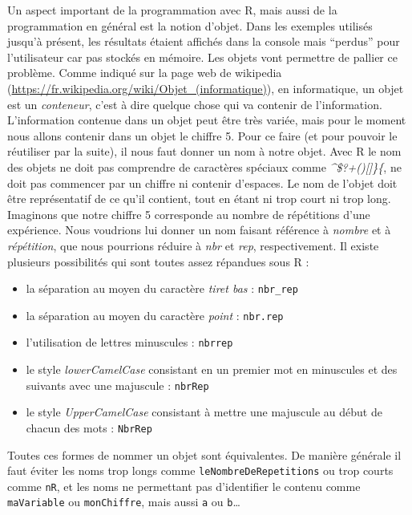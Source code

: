 \documentclass[twoside,symmetric]{book}
\providecommand{\tightlist}{%
  \setlength{\itemsep}{0pt}\setlength{\parskip}{0pt}}
\begin{document}
Un aspect important de la programmation avec R, mais aussi de la programmation en général est la notion d'objet. Dans les exemples utilisés jusqu'à présent, les résultats étaient affichés dans la console mais ``perdus'' pour l'utilisateur car pas stockés en mémoire. Les objets vont permettre de pallier ce problème. Comme indiqué sur la page web de wikipedia (\url{https://fr.wikipedia.org/wiki/Objet_(informatique)}), en informatique, un objet est un \emph{conteneur}, c'est à dire quelque chose qui va contenir de l'information. L'information contenue dans un objet peut être très variée, mais pour le moment nous allons contenir dans un objet le chiffre 5. Pour ce faire (et pour pouvoir le réutiliser par la suite), il nous faut donner un nom à notre objet. Avec R le nom des objets ne doit pas comprendre de caractères spéciaux comme \emph{\^{}\$?\textbar{}+(){[}{]}\}\{}, ne doit pas commencer par un chiffre ni contenir d'espaces. Le nom de l'objet doit être représentatif de ce qu'il contient, tout en étant ni trop court ni trop long. Imaginons que notre chiffre 5 corresponde au nombre de répétitions d'une expérience. Nous voudrions lui donner un nom faisant référence à \emph{nombre} et à \emph{répétition}, que nous pourrions réduire à \emph{nbr} et \emph{rep}, respectivement. Il existe plusieurs possibilités qui sont toutes assez répandues sous R :

\begin{itemize}
\tightlist
\item
  la séparation au moyen du caractère \emph{tiret bas} : \texttt{nbr\_rep}
\item
  la séparation au moyen du caractère \emph{point} : \texttt{nbr.rep}
\item
  l'utilisation de lettres minuscules : \texttt{nbrrep}
\item
  le style \emph{lowerCamelCase} consistant en un premier mot en minuscules et des suivants avec une majuscule : \texttt{nbrRep}
\item
  le style \emph{UpperCamelCase} consistant à mettre une majuscule au début de chacun des mots : \texttt{NbrRep}
\end{itemize}

Toutes ces formes de nommer un objet sont équivalentes. De manière générale il faut éviter les noms trop longs comme \texttt{leNombreDeRepetitions} ou trop courts comme \texttt{nR}, et les noms ne permettant pas d'identifier le contenu comme \texttt{maVariable} ou \texttt{monChiffre}, mais aussi \texttt{a} ou \texttt{b}\ldots{}
\end{document}
